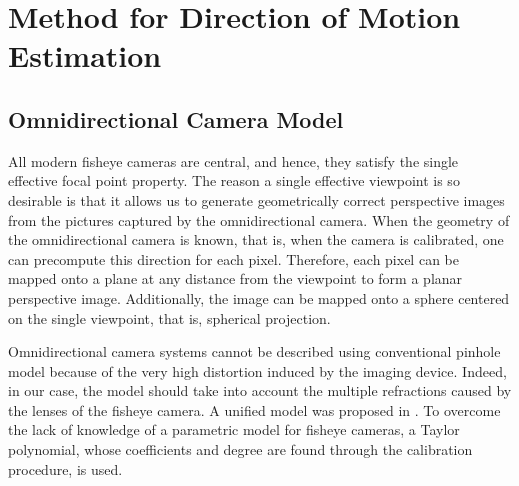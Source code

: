 \section{Method for Direction of Motion Estimation}	
\subsection{Omnidirectional Camera Model}

All modern fisheye cameras are central, and hence, they satisfy the single effective focal point property. The reason a single effective viewpoint is so desirable is that it allows us to generate geometrically correct perspective images from the pictures captured by the omnidirectional camera. When the geometry of the omnidirectional camera is known, that is, when the camera is calibrated, one can precompute this direction for each pixel. Therefore, each pixel can be mapped onto a plane at any distance from the viewpoint to form a planar perspective image. Additionally, the image can be mapped onto a sphere centered on the single viewpoint, that is, spherical projection.

Omnidirectional camera systems cannot be described using conventional pinhole model because of the very high distortion induced by the imaging device. Indeed, in our case, the model should take into account the multiple refractions caused by the lenses of the fisheye camera. A unified model was proposed in \cite{scara}. To overcome the lack of knowledge of a parametric model for fisheye cameras, a Taylor polynomial, whose coefficients and degree are found through the calibration procedure, is used.

